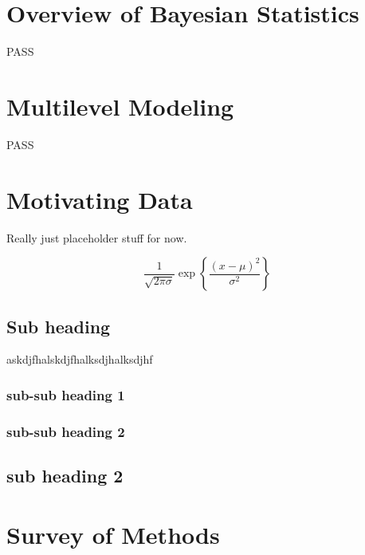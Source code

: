 \documentclass[
]{article}
\begin{document}
\hypertarget{overview-of-bayesian-statistics}{%
\section{Overview of Bayesian Statistics}\label{overview-of-bayesian-statistics}}

PASS

\hypertarget{multilevel-modeling}{%
\section{Multilevel Modeling}\label{multilevel-modeling}}

PASS

\hypertarget{motivating-data}{%
\section{Motivating Data}\label{motivating-data}}

Really just placeholder stuff for now.

\[
\frac{1}{\sqrt{2\pi\sigma}} \exp{\left\lbrace \frac{(x-\mu)^2}{\sigma^2} \right\rbrace}
\]

\hypertarget{sub-heading}{%
\subsection{Sub heading}\label{sub-heading}}

askdjfhalskdjfhalksdjhalksdjhf

\hypertarget{sub-sub-heading-1}{%
\subsubsection{sub-sub heading 1}\label{sub-sub-heading-1}}

\hypertarget{sub-sub-heading-2}{%
\subsubsection{sub-sub heading 2}\label{sub-sub-heading-2}}

\hypertarget{sub-heading-2}{%
\subsection{sub heading 2}\label{sub-heading-2}}

\hypertarget{survey-of-methods}{%
\section{Survey of Methods}\label{survey-of-methods}}
\end{document}
